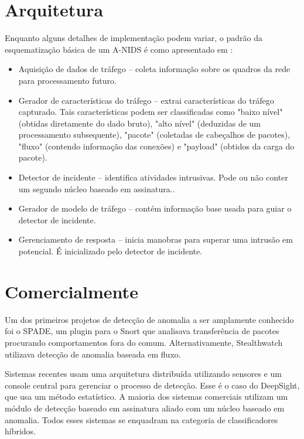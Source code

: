  \section{Arquitetura}
    Enquanto alguns detalhes de implementação podem variar, o padrão da esquematização básica de um A-NIDS
    é como apresentado em \cite{catania12}:
    \begin{itemize}
        \item Aquisição de dados de tráfego -- coleta informação sobre os quadros da rede para processamento futuro.
        \item Gerador de características do tráfego -- extrai características do tráfego capturado. Tais características
         podem ser classificadas como "baixo nível" (obtidas diretamente do dado bruto), "alto nível" (deduzidas de um
         processamento subsequente), "pacote" (coletadas de cabeçalhos de pacotes), "fluxo" (contendo informação das
         conexões) e "payload" (obtidos da carga do pacote).
        \item Detector de incidente -- identifica atividades intrusivas. Pode ou não conter um segundo núcleo baseado
        em assinatura..
        \item Gerador de modelo de tráfego -- contém informação base usada para guiar o detector de incidente.
        \item Gerenciamento de resposta -- inicia manobras para superar uma intrusão em potencial. É inicializado pelo
        detector de incidente.
    \end{itemize}

 \section{Comercialmente}
 Um dos primeiros projetos de detecção de anomalia a ser amplamente conhecido foi o SPADE, um plugin para o Snort que
 analisava transferência de pacotes procurando comportamentos fora do comum. Alternativamente, Stealthwatch utilizava
 detecção de anomalia baseada em fluxo.
 \par Sistemas recentes usam uma arquitetura distribuída utilizando sensores e um
 console central para gerenciar o processo de detecção. Esse é o caso do DeepSight, que usa um método estatístico.
 A maioria dos sistemas comerciais utilizam um módulo de detecção baseado em assinatura aliado com um núcleo baseado em
 anomalia. Todos esses sistemas se enquadram na categoria de classificadores híbridos.